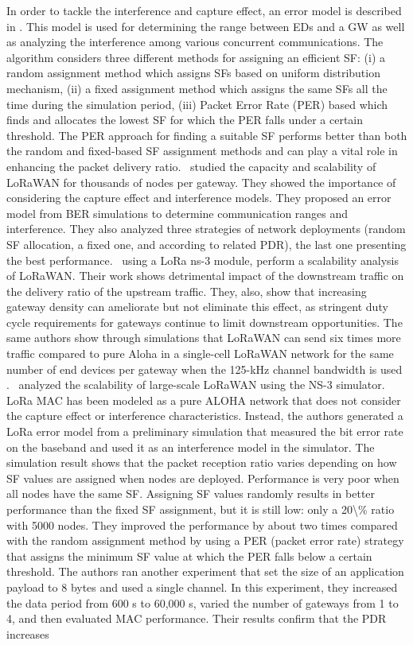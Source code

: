  \cite{abeele_scalability_2017}   In order to tackle the interference and capture effect, an error model is described in \cite{abeele_scalability_2017}. This model is used for determining the range between EDs and a GW as well as analyzing the interference among various concurrent communications. The algorithm considers three different methods for assigning an efficient SF: (i) a random assignment method which assigns SFs based on uniform distribution mechanism, (ii) a fixed assignment method which assigns the same SFs all the time during the simulation period, (iii) Packet Error Rate (PER) based which finds and allocates the lowest SF for which the PER falls under a certain threshold. The PER approach for finding a suitable SF performs better than both the random and fixed-based SF assignment methods and can play a vital role in enhancing the packet delivery ratio.~\citet{abeele_scalability_2017} studied the capacity and scalability of LoRaWAN for thousands of nodes per gateway. They showed the importance of considering the capture effect and interference models. They proposed an error model from BER simulations to determine communication ranges and interference. They also analyzed three strategies of network deployments (random SF allocation, a fixed one, and according to related PDR), the last one presenting the best performance.~\citet{abeele_scalability_2017} using a LoRa ns-3 module, perform a scalability analysis of LoRaWAN. Their work shows detrimental impact of the downstream traffic on the delivery ratio of the upstream traffic. They, also, show that increasing gateway density can ameliorate but not eliminate this effect, as stringent duty cycle requirements for gateways continue to limit downstream opportunities. The same authors show through simulations that LoRaWAN can send six times more traffic compared to pure Aloha in a single-cell LoRaWAN network for the same number of end devices per gateway when the 125-kHz channel bandwidth is used \cite{jetmir_haxhibeqiri_lora_2017}.~\citet{abeele_scalability_2017} analyzed the scalability of large-scale LoRaWAN using the NS-3 simulator. LoRa MAC has been modeled as a pure ALOHA network that does not consider the capture effect or interference characteristics. Instead, the authors generated a LoRa error model from a preliminary simulation that measured the bit error rate on the baseband and used it as an interference model in the simulator. The simulation result shows that the packet reception ratio varies depending on how SF values are assigned when nodes are deployed. Performance is very poor when all nodes have the same SF. Assigning SF values randomly results in better performance than the fixed SF assignment, but it is still low: only a 20\textbackslash\% ratio with 5000 nodes. They improved the performance by about two times compared with the random assignment method by using a PER (packet error rate) strategy that assigns the minimum SF value at which the PER falls below a certain threshold. The authors ran another experiment that set the size of an application payload to 8 bytes and used a single channel. In this experiment, they increased the data period from 600 s to 60,000 s, varied the number of gateways from 1 to 4, and then evaluated MAC performance. Their results confirm that the PDR increases 